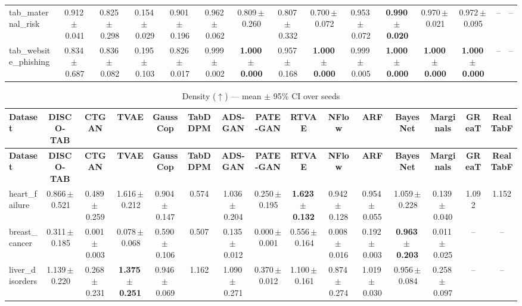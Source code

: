 \documentclass[8pt]{extarticle}
\begin{document}
\begin{longtable}{l*{14}{c}}
tab\_maternal\_risk & 0.912\,$\pm$\,0.041 & 0.825\,$\pm$\,0.298 & 0.154\,$\pm$\,0.029 & 0.901\,$\pm$\,0.196 & 0.962\,$\pm$\,0.062 & 0.809\,$\pm$\,0.260 & 0.807\,$\pm$\,0.332 & 0.700\,$\pm$\,0.072 & 0.953\,$\pm$\,0.072 & \textbf{0.990\,$\pm$\,0.020} & 0.970\,$\pm$\,0.021 & 0.972\,$\pm$\,0.095 & -- & -- \\
tab\_website\_phishing & 0.834\,$\pm$\,0.687 & 0.836\,$\pm$\,0.082 & 0.195\,$\pm$\,0.103 & 0.826\,$\pm$\,0.017 & 0.999\,$\pm$\,0.002 & \textbf{1.000\,$\pm$\,0.000} & 0.957\,$\pm$\,0.168 & \textbf{1.000\,$\pm$\,0.000} & 0.999\,$\pm$\,0.005 & \textbf{1.000\,$\pm$\,0.000} & \textbf{1.000\,$\pm$\,0.000} & \textbf{1.000\,$\pm$\,0.000} & -- & -- \\
\end{longtable}
\begin{longtable}{l*{14}{c}}
\caption{Density ($\uparrow$) --- mean $\pm$ 95\% CI over seeds}\\
\toprule
\textbf{Dataset} & \textbf{DISCO-TAB} & \textbf{CTGAN} & \textbf{TVAE} & \textbf{GaussCop} & \textbf{TabDDPM} & \textbf{ADS-GAN} & \textbf{PATE-GAN} & \textbf{RTVAE} & \textbf{NFlow} & \textbf{ARF} & \textbf{BayesNet} & \textbf{Marginals} & \textbf{GReaT} & \textbf{RealTabF} \\
\midrule
\endfirsthead
\toprule
\textbf{Dataset} & \textbf{DISCO-TAB} & \textbf{CTGAN} & \textbf{TVAE} & \textbf{GaussCop} & \textbf{TabDDPM} & \textbf{ADS-GAN} & \textbf{PATE-GAN} & \textbf{RTVAE} & \textbf{NFlow} & \textbf{ARF} & \textbf{BayesNet} & \textbf{Marginals} & \textbf{GReaT} & \textbf{RealTabF} \\
\midrule
\endhead
\bottomrule
\endfoot
heart\_failure & 0.866\,$\pm$\,0.521 & 0.489\,$\pm$\,0.259 & 1.616\,$\pm$\,0.212 & 0.904\,$\pm$\,0.147 & 0.574 & 1.036\,$\pm$\,0.204 & 0.250\,$\pm$\,0.195 & \textbf{1.623\,$\pm$\,0.132} & 0.942\,$\pm$\,0.128 & 0.954\,$\pm$\,0.055 & 1.059\,$\pm$\,0.228 & 0.139\,$\pm$\,0.040 & 1.092 & 1.152 \\
breast\_cancer & 0.311\,$\pm$\,0.185 & 0.001\,$\pm$\,0.003 & 0.078\,$\pm$\,0.068 & 0.590\,$\pm$\,0.106 & 0.507 & 0.135\,$\pm$\,0.012 & 0.000\,$\pm$\,0.001 & 0.556\,$\pm$\,0.164 & 0.008\,$\pm$\,0.016 & 0.192\,$\pm$\,0.003 & \textbf{0.963\,$\pm$\,0.203} & 0.011\,$\pm$\,0.025 & -- & -- \\
liver\_disorders & 1.139\,$\pm$\,0.220 & 0.268\,$\pm$\,0.231 & \textbf{1.375\,$\pm$\,0.251} & 0.946\,$\pm$\,0.069 & 1.162 & 1.090\,$\pm$\,0.271 & 0.370\,$\pm$\,0.012 & 1.100\,$\pm$\,0.161 & 0.874\,$\pm$\,0.274 & 1.019\,$\pm$\,0.030 & 0.956\,$\pm$\,0.084 & 0.258\,$\pm$\,0.097 & -- & -- \\

\end{longtable}
\end{document}
